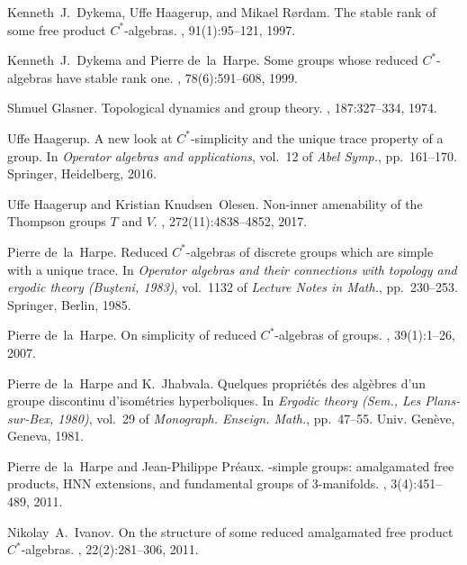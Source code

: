 \documentclass[a4paper]{amsart}
\theoremstyle{plain}
\theoremstyle{definition}
\theoremstyle{remark}
\numberwithin{theorem}{section}
\begin{document}
\begin{thebibliography}{99}
Kenneth~J.\ Dykema, Uffe Haagerup, and Mikael R{\o}rdam.
\newblock The stable rank of some free product {$C^*$}-algebras.
, 91(1):95--121, 1997.

Kenneth~J.\ Dykema and Pierre de~la~Harpe.
\newblock Some groups whose reduced {$C^*$}-algebras have stable rank one.
, 78(6):591--608, 1999.

Shmuel Glasner.
\newblock Topological dynamics and group theory.
, 187:327--334, 1974.

Uffe Haagerup.
\newblock A new look at {$C^*$}-simplicity and the unique trace property of a group.
\newblock In {\em Operator algebras and applications}, vol.~12 of {\em Abel Symp.}, pp.~161--170. Springer, Heidelberg, 2016.

Uffe Haagerup and Kristian Knudsen~Olesen.
\newblock Non-inner amenability of the {T}hompson groups {$T$} and {$V$}.
, 272(11):4838--4852, 2017.

Pierre de~la~Harpe.
\newblock Reduced {$C^*$}-algebras of discrete groups which are simple with a unique trace.
\newblock In {\em Operator algebras and their connections with topology and ergodic theory ({B}u\c steni, 1983)}, vol.~1132 of {\em Lecture Notes in Math.}, pp.~230--253. Springer, Berlin, 1985.

Pierre de~la~Harpe.
\newblock On simplicity of reduced {$C^*$}-algebras of groups.
, 39(1):1--26, 2007.

Pierre de~la~Harpe and K.\ Jhabvala.
\newblock Quelques propri\'et\'es des alg\`ebres d'un groupe discontinu d'isom\'etries hyperboliques.
\newblock In {\em Ergodic theory ({S}em., {L}es {P}lans-sur-{B}ex, 1980)}, vol.~29 of {\em Monograph. Enseign. Math.}, pp.~47--55. Univ. Gen\`eve, Geneva, 1981.

Pierre de~la~Harpe and Jean-Philippe Pr{\'e}aux.
-simple groups: amalgamated free products, {HNN} extensions, and fundamental groups of $3$-manifolds.
, 3(4):451--489, 2011.

Nikolay~A.\ Ivanov.
\newblock On the structure of some reduced amalgamated free product {$C^*$}-algebras.
, 22(2):281--306, 2011.


\end{thebibliography}
\end{document}
